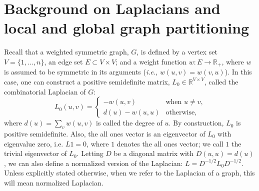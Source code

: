 \documentclass[12pt]{article}
\newcommand{\reals}{\mathbb{R}}
\theoremstyle{plain}
\begin{document}
\section{Background on Laplacians and local and global graph partitioning}
\label{S:introduction}

Recall that a weighted symmetric graph, $G$, is defined by a vertex set 
$V = \{ 1, \dotsc, n \}$,
an edge set $E \subset V \times V$; 
and a weight function $w : E \to \reals_+$, where $w$ is assumed to 
be symmetric in its arguments (\emph{i.e.}, $w(u,v) = w(v,u)$).  
In this case, one can construct a positive
semidefinite matrix, $L_0 \in \reals^{V \times V}$, called the 
combinatorial Laplacian of $G$:
\[
  L_0(u,v)
  =
  \begin{cases}
    - w(u,v) & \text{when $u \neq v$,} \\
    d(u) - w(u,u) & \text{otherwise,}
  \end{cases}
\]
where $d(u) = \sum_{v} w(u,v)$ is called the degree of $u$.
By construction, $L_0$ is positive semidefinite.  
Also, the all ones
vector is an eigenvector of $L_0$ with eigenvalue zero, i.e. $L 1 =
0$, where $1$ denotes the all ones vector; we call $1$ the
trivial eigenvector of $L_0$.  Letting $D$ be a diagonal matrix with
$D(u,u) = d(u)$, we can also define a normalized version of the
Laplacian: $L = D^{-1/2} L_0 D^{-1/2}$.  Unless explicitly stated
otherwise, when we refer to the Laplacian of a graph, this will mean
normalized Laplacian.
\end{document}
